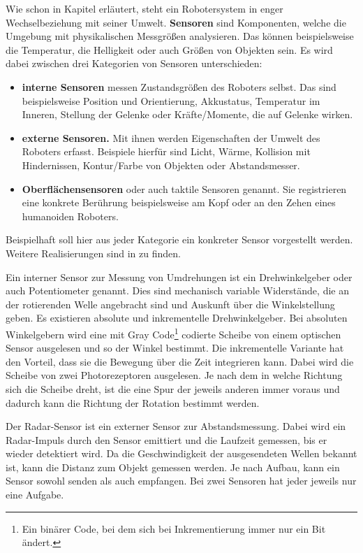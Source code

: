 Wie schon in Kapitel  erläutert, steht ein Robotersystem in enger Wechselbeziehung mit seiner Umwelt. \textbf{Sensoren} sind Komponenten, welche die Umgebung mit physikalischen Messgrößen analysieren. Das können beispielsweise die Temperatur, die Helligkeit oder auch Größen von Objekten sein. Es wird dabei zwischen drei Kategorien von Sensoren unterschieden:
\begin{itemize}
\item \textbf{interne Sensoren} messen Zustandsgrößen des Roboters selbst. Das sind beispielsweise Position und Orientierung, Akkustatus, Temperatur im Inneren, Stellung der Gelenke oder Kräfte/Momente, die auf Gelenke wirken.
\item \textbf{externe Sensoren.} Mit ihnen werden Eigenschaften der Umwelt des Roboters erfasst. Beispiele hierfür sind Licht, Wärme, Kollision mit Hindernissen, Kontur/Farbe von Objekten oder Abstandsmesser. 
\item \textbf{Oberflächensensoren} oder auch taktile Sensoren genannt. Sie registrieren eine konkrete Berührung beispielsweise am Kopf oder an den Zehen eines humanoiden Roboters.
\end{itemize}
Beispielhaft soll hier aus jeder Kategorie ein konkreter Sensor vorgestellt werden. Weitere Realisierungen sind in \cite{Haun2007} zu finden.

Ein interner Sensor zur Messung von Umdrehungen ist ein Drehwinkelgeber oder auch Potentiometer genannt. Dies sind mechanisch variable Widerstände, die an der rotierenden Welle angebracht sind und Auskunft über die Winkelstellung geben. Es existieren absolute und inkrementelle Drehwinkelgeber. Bei absoluten Winkelgebern wird eine mit Gray Code\footnote{Ein binärer Code, bei dem sich bei Inkrementierung immer nur ein Bit ändert.} codierte Scheibe von einem optischen Sensor ausgelesen und so der Winkel bestimmt. Die inkrementelle Variante hat den Vorteil, dass sie die Bewegung über die Zeit integrieren kann. Dabei wird die Scheibe von zwei Photorezeptoren ausgelesen. Je nach dem in welche Richtung sich die Scheibe dreht, ist die eine Spur der jeweils anderen immer voraus und dadurch kann die Richtung der Rotation bestimmt werden.

Der Radar-Sensor ist ein externer Sensor zur Abstandsmessung. Dabei wird ein Radar-Impuls durch den Sensor emittiert und die Laufzeit gemessen, bis er wieder detektiert wird. Da die Geschwindigkeit der ausgesendeten Wellen bekannt ist, kann die Distanz zum Objekt gemessen werden. Je nach Aufbau, kann ein Sensor sowohl senden als auch empfangen. Bei zwei Sensoren hat jeder jeweils nur eine Aufgabe.

